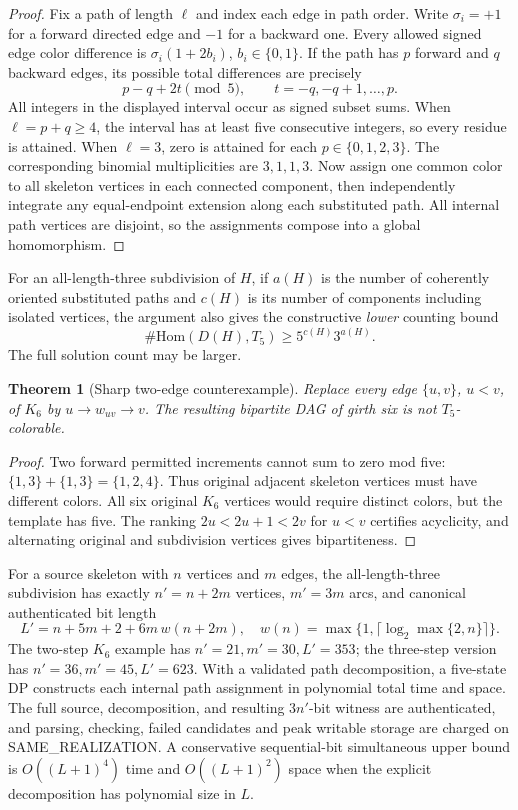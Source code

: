 \documentclass[11pt]{article}
\newtheorem{theorem}{Theorem}
\begin{document}
\begin{proof}
Fix a path of length \(\ell\) and index each edge in path order.
Write \(\sigma_i=+1\) for a forward directed edge and \(-1\) for
a backward one. Every allowed signed edge color difference is
\(\sigma_i(1+2b_i)\), \(b_i\in\{0,1\}\).
If the path has \(p\) forward and \(q\) backward edges, its possible
total differences are precisely
\[
p-q+2t\pmod5,\qquad t=-q,-q+1,\ldots,p.
\]
All integers in the displayed interval occur as signed subset sums.
When \(\ell=p+q\ge4\), the interval has at least five consecutive
integers, so every residue is attained. When \(\ell=3\), zero
is attained for each \(p\in\{0,1,2,3\}\).
The corresponding binomial multiplicities are \(3,1,1,3\).
Now assign one common color to all skeleton vertices in each
connected component, then independently integrate any equal-endpoint
extension along each substituted path. All internal path vertices
are disjoint, so the assignments compose into a global homomorphism.
\end{proof}

For an all-length-three subdivision of \(H\), if \(a(H)\) is the
number of coherently oriented substituted paths and \(c(H)\)
is its number of components including isolated vertices, the argument
also gives the constructive \emph{lower} counting bound
\[
\#\mathrm{Hom}(D(H),T_5)\ge 5^{c(H)}3^{a(H)}.
\]
The full solution count may be larger.

\begin{theorem}[Sharp two-edge counterexample]
Replace every edge \(\{u,v\}\), \(u<v\), of \(K_6\) by
\(u\to w_{uv}\to v\). The resulting bipartite DAG of girth six
is \emph{not} \(T_5\)-colorable.
\end{theorem}
\begin{proof}
Two forward permitted increments cannot sum to zero mod five:
\(\{1,3\}+\{1,3\}=\{1,2,4\}\).
Thus original adjacent skeleton vertices must have different colors.
All six original \(K_6\) vertices would require distinct colors,
but the template has five. The ranking \(2u<2u+1<2v\)
for \(u<v\) certifies acyclicity, and alternating original and
subdivision vertices gives bipartiteness.
\end{proof}

For a source skeleton with \(n\) vertices and \(m\) edges, the
all-length-three subdivision has exactly \(n'=n+2m\) vertices,
\(m'=3m\) arcs, and canonical authenticated bit length
\[
L'=n+5m+2+6m\,w(n+2m),\quad
w(n)=\max\{1,\lceil\log_2\max\{2,n\}\rceil\}.
\]
The two-step \(K_6\) example has \(n'=21,m'=30,L'=353\);
the three-step version has \(n'=36,m'=45,L'=623\).
With a validated path decomposition, a five-state DP constructs
each internal path assignment in polynomial total time and space.
The full source, decomposition, and resulting \(3n'\)-bit witness
are authenticated, and parsing, checking, failed candidates and
peak writable storage are charged on SAME\_REALIZATION.
A conservative sequential-bit simultaneous upper bound is
\(O((L+1)^4)\) time and \(O((L+1)^2)\) space when the
explicit decomposition has polynomial size in \(L\).
\end{document}
